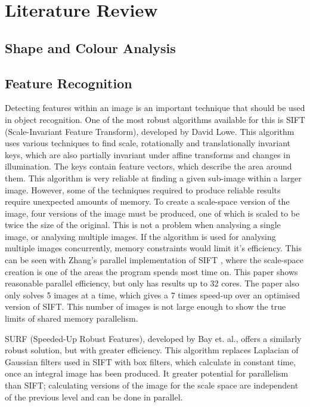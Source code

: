 \documentclass[../main.tex]{subfiles}
\begin{document}
  \section{Literature Review}
    \subsection{Shape and Colour Analysis}
    \subsection{Feature Recognition}
      Detecting features within an image is an important technique that should be used in object recognition.
      One of the most robust algorithms available for this is SIFT (Scale-Invariant Feature Transform), developed by David Lowe\cite{sift}.
      This algorithm uses various techniques to find scale, rotationally and translationally invariant keys, which are also partially invariant under affine transforms and changes in illumination.
      The keys contain feature vectors, which describe the area around them.
      This algorithm is very reliable at finding a given sub-image within a larger image.
      However, some of the techniques required to produce reliable results require unexpected amounts of memory.
      To create a scale-space version of the image, four versions of the image must be produced, one of which is scaled to be twice the size of the original.
      This is not a problem when analysing a single image, or analysing multiple images.
      If the algorithm is used for analysing multiple images concurrently, memory constraints would limit it's efficiency.
      This can be seen with Zhang's parallel implementation of SIFT \cite{zhangsift}, where the scale-space creation is one of the areas the program spends most time on.
      This paper shows reasonable parallel efficiency, but only has results up to 32 cores.
      The paper also only solves 5 images at a time, which gives a 7 times speed-up over an optimised version of SIFT.
      This number of images is not large enough to show the true limits of shared memory parallelism.

      SURF (Speeded-Up Robust Features), developed by Bay et. al.\cite{surf}, offers a similarly robust solution, but with greater efficiency.
      This algorithm replaces Laplacian of Gaussian filters used in SIFT with box filters, which calculate in constant time, once an integral image has been produced.
      It greater potential for parallelism than SIFT; calculating versions of the image for the scale space are independent of the previous level and can be done in parallel.
      
    \biblio
\end{document}
